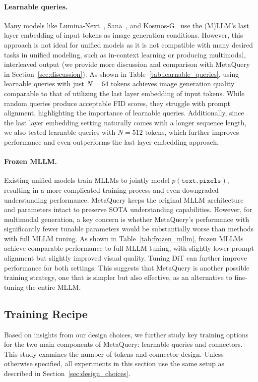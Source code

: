\documentclass[]{fairmeta}
\newcommand\our{{\fontfamily{lmtt}\selectfont MetaQuery}\xspace}
\begin{document}
\paragraph{Learnable queries.}
Many models like Lumina-Next~\citep{luminanext}, Sana~\citep{sana}, and Kosmos-G~\citep{kosmosg} use the (M)LLM's last layer embedding of input tokens as image generation conditions. However, this approach is not ideal for unified models as it is not compatible with many desired tasks in unified modeling, such as in-context learning or producing multimodal, interleaved output (we provide more discussion and comparison with \our in Section~\ref{sec:discussion}). As shown in Table~\ref{tab:learnable_queries}, using learnable queries with just $N=64$ tokens achieves image generation quality comparable to that of utilizing the last layer embedding of input tokens. While random queries produce acceptable FID scores, they struggle with prompt alignment, highlighting the importance of learnable queries. Additionally, since the last layer embedding setting naturally comes with a longer sequence length, we also tested learnable queries with $N=512$ tokens, which further improves performance and even outperforms the last layer embedding approach.

\paragraph{Frozen MLLM.}
Existing unified models train MLLMs to jointly model $p(\texttt{text}, \texttt{pixels})$, resulting in a more complicated training process and even downgraded understanding performance. \our keeps the original MLLM architecture and parameters intact to preserve SOTA understanding capabilities. However, for multimodal generation, a key concern is whether \our's performance with significantly fewer tunable parameters would be substantially worse than methods with full MLLM tuning. As shown in Table~\ref{tab:frozen_mllm}, frozen MLLMs achieve comparable performance to full MLLM tuning, with slightly lower prompt alignment but slightly improved visual quality. Tuning DiT can further improve performance for both settings. This suggests that \our is another possible training strategy, one that is simpler but also effective, as an alternative to fine-tuning the entire MLLM.

\subsection{Training Recipe}
Based on insights from our design choices, we further study key training options for the two main components of \our: learnable queries and connectors. This study examines the number of tokens and connector design. Unless otherwise specified, all experiments in this section use the same setup as described in Section~\ref{sec:design_choices}.
\end{document}
